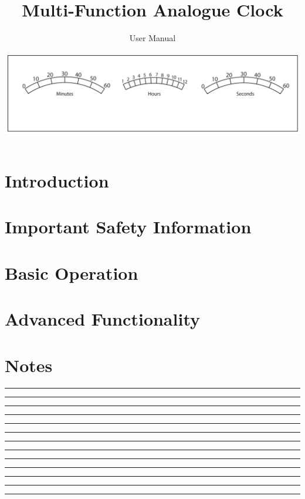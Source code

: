 \documentclass[11pt,a4paper,twoside,titlepage]{scrartcl}
\title{\vspace{-24pt}\Huge Multi-Function Analogue Clock}
\subtitle{\vspace{8pt}\LARGE User Manual}
\author{}
\date{\vspace{12pt}\includegraphics[width=\textwidth]{images/scales}}
\begin{document}
\maketitle


\section{Introduction}


\clearpage
\section{Important Safety Information}


\clearpage
\section{Basic Operation}


\clearpage
\section{Advanced Functionality}



\clearpage
\appendix
\appendixpage



\clearpage
\section{Notes}
\vspace{1cm}
\noindent\rule{\textwidth}{0.2pt}
\vspace{1cm}
\noindent\rule{\textwidth}{0.2pt}
\vspace{1cm}
\noindent\rule{\textwidth}{0.2pt}
\vspace{1cm}
\noindent\rule{\textwidth}{0.2pt}
\vspace{1cm}
\noindent\rule{\textwidth}{0.2pt}
\vspace{1cm}
\noindent\rule{\textwidth}{0.2pt}
\vspace{1cm}
\noindent\rule{\textwidth}{0.2pt}
\vspace{1cm}
\noindent\rule{\textwidth}{0.2pt}
\vspace{1cm}
\noindent\rule{\textwidth}{0.2pt}
\vspace{1cm}
\noindent\rule{\textwidth}{0.2pt}
\vspace{1cm}
\noindent\rule{\textwidth}{0.2pt}
\vspace{1cm}
\noindent\rule{\textwidth}{0.2pt}
\vspace{1cm}
\noindent\rule{\textwidth}{0.2pt}
\vspace{1cm}
\end{document}
